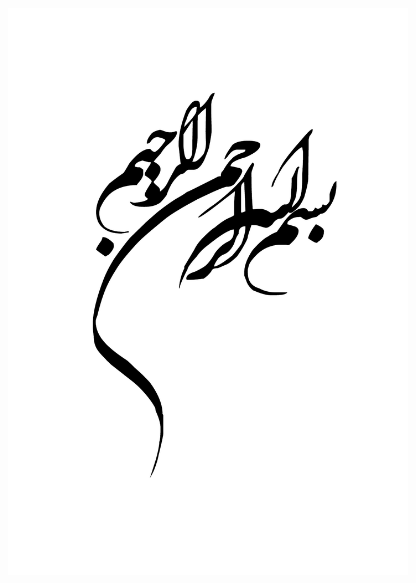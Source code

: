 
\newpage
\thispagestyle{empty}
\begin{center}
\begin{figure}[!h]
\centerline{\includegraphics[height=15cm,width=12cm]{besme.pdf}} 
\end{figure}
\end{center}

\vfill

\mbox{ }

